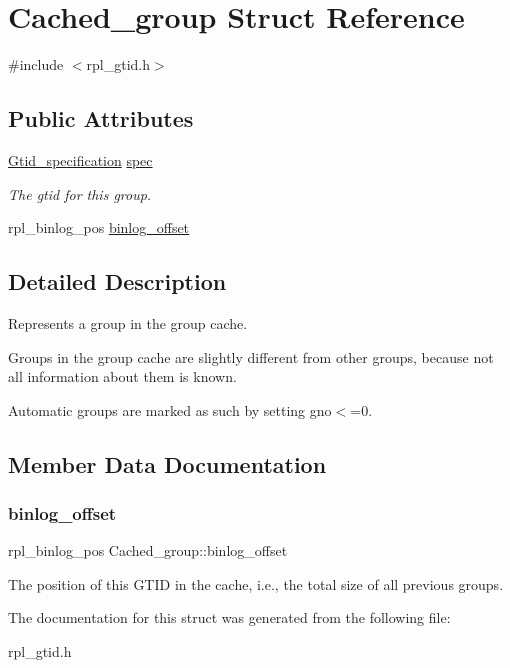 \hypertarget{structCached__group}{}\section{Cached\+\_\+group Struct Reference}
\label{structCached__group}


{\ttfamily \#include $<$rpl\+\_\+gtid.\+h$>$}

\subsection*{Public Attributes}
\begin{DoxyCompactItemize}
\item 
\mbox{\label{structCached__group_a6d383bed37684d8f431ecd4535c8a23d}} 
\mbox{\hyperlink{structGtid__specification}{Gtid\+\_\+specification}} \mbox{\hyperlink{structCached__group_a6d383bed37684d8f431ecd4535c8a23d}{spec}}
\begin{DoxyCompactList}\small\item\em The gtid for this group. \end{DoxyCompactList}\item 
rpl\+\_\+binlog\+\_\+pos \mbox{\hyperlink{structCached__group_abd05e97d04df02bbe0661a95eda3d7c7}{binlog\+\_\+offset}}
\end{DoxyCompactItemize}


\subsection{Detailed Description}
Represents a group in the group cache.

Groups in the group cache are slightly different from other groups, because not all information about them is known.

Automatic groups are marked as such by setting gno$<$=0. 

\subsection{Member Data Documentation}
\mbox{\label{structCached__group_abd05e97d04df02bbe0661a95eda3d7c7}} 
\subsubsection{\texorpdfstring{binlog\+\_\+offset}{binlog\_offset}}
{\footnotesize\ttfamily rpl\+\_\+binlog\+\_\+pos Cached\+\_\+group\+::binlog\+\_\+offset}

The position of this G\+T\+ID in the cache, i.\+e., the total size of all previous groups. 

The documentation for this struct was generated from the following file\+:\begin{DoxyCompactItemize}
\item 
rpl\+\_\+gtid.\+h\end{DoxyCompactItemize}
